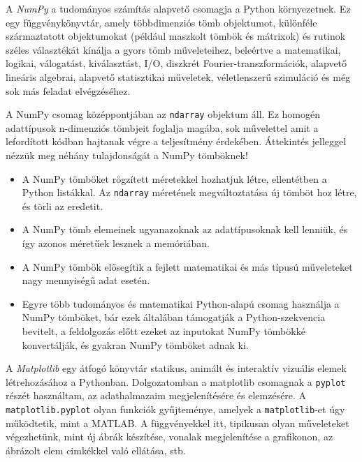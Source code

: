 
A \textit{NumPy} a tudományos számítás alapvető csomagja a Python környezetnek.
Ez egy függvénykönyvtár, amely többdimenziós tömb objektumot, különféle származtatott objektumokat (például maszkolt tömbök és mátrixok) és rutinok széles választékát kínálja a gyors tömb műveleteihez, beleértve a matematikai, logikai, válogatást, kiválasztást, I/O, diszkrét Fourier-transzformációk, alapvető lineáris algebrai, alapvető statisztikai műveletek, véletlenszerű szimuláció és még sok más feladat elvégzéséhez.

A NumPy csomag középpontjában az \texttt{ndarray} objektum áll. Ez homogén adattípusok n-dimenziós tömbjeit foglalja magába, sok művelettel amit a lefordított kódban hajtanak végre a teljesítmény érdekében.
Áttekintés jelleggel nézzük meg néhány tulajdonságát a NumPy tömböknek!
\begin{itemize}
\item A NumPy tömböket rögzített méretekkel hozhatjuk létre, ellentétben a Python listákkal.
Az \texttt{ndarray} méretének megváltoztatása új tömböt hoz létre, és törli az eredetit.
\item A NumPy tömb elemeinek ugyanazoknak az adattípusoknak kell lenniük, és így azonos méretűek lesznek a memóriában.
\item A NumPy tömbök elősegítik a fejlett matematikai és más típusú műveleteket nagy mennyiségű adat esetén.
\item Egyre több tudományos és matematikai Python-alapú csomag használja a NumPy tömböket, bár ezek általában támogatják a Python-szekvencia bevitelt, a feldolgozás előtt ezeket az inputokat NumPy tömbökké konvertálják, és gyakran NumPy tömböket adnak ki.
\end{itemize}


A \textit{Matplotlib} egy átfogó könyvtár statikus, animált és interaktív vizuális elemek létrehozásához a Pythonban.
Dolgozatomban a matplotlib csomagnak a \texttt{pyplot} részét használtam, az adathalmazaim megjelenítésére és elemzésére. A \texttt{matplotlib.pyplot} olyan funkciók gyűjteménye, amelyek a \texttt{matplotlib}-et úgy működtetik, mint a MATLAB. A függvényekkel itt, tipikusan olyan műveleteket végezhetünk, mint új ábrák készítése, vonalak megjelenítése a grafikonon, az ábrázolt elem cimkékkel való ellátása, stb.

